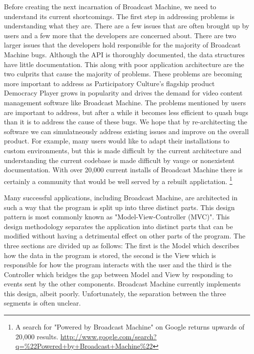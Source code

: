\documentclass[a4paper,12pt]{report}
\begin{document}
Before creating the next incarnation of Broadcast Machine, we need to understand its current shortcomings.
The first step in addressing problems is understanding what they are.
There are a few issues that are often brought up by users and a few more that the developers are concerned about.
There are two larger issues that the developers hold responsible for the majority of Broadcast Machine bugs.
Although the API is thoroughly documented, the data structures have little documentation.
This along with poor application architecture are the two culprits that cause the majority of problems.
These problems are becoming more important to address as Participatory Culture's flagship product Democracy Player grows in popularity and drives the demand for video content management software like Broadcast Machine.
The problems mentioned by users are important to address, but after a while it becomes less efficient to quash bugs than it is to address the cause of these bugs.
We hope that by re-architecting the software we can simulatneously address existing issues and improve on the overall product.
For example, many users would like to adapt their installations to custom environments, but this is made difficult by the current architecture and understanding the current codebase is made difficult by vauge or nonexistent documentation.
With over 20,000 current installs of Broadcast Machine there is certainly a community that would be well served by a rebuilt applictation. \footnote{A search for "Powered by Broadcast Machine" on Google returns upwards of 20,000 results. \url{ http://www.google.com/search?q=\%22Powered+by+Broadcast+Machine\%22}}

Many successful applications, including Broadcast Machine, are architected in such a way that the program is split up into three distinct parts.
This design pattern is most commonly known as "Model-View-Controller (MVC)".
This design methodology separates the application into distinct parts that can be modified without having a detrimental effect on other parts of the program.
The three sections are divided up as follows: The first is the Model which describes how the data in the program is stored, the second is the View which is responsible for how the program interacts with the user and the third is the Controller which bridges the gap between Model and View by responding to events sent by the other components.
Broadcast Machine currently implements this design, albeit poorly.
Unfortunately, the separation between the three segments is often unclear.
\end{document}
